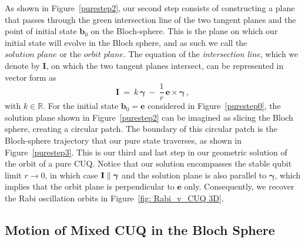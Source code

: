 \documentclass[12pt,a4paper]{article}
\begin{document}
As shown in Figure~\ref{purestep2}, our second step consists of constructing a plane that passes through the green intersection line of the two tangent planes and the point of initial state $\mathbf{b}_0$ on the Bloch-sphere. This is the plane on which our initial state will evolve in the Bloch sphere, and as such we call the $\textit{solution plane}$ or the $\textit{orbit plane}$. The equation of the {\em intersection line}, which we denote by $\mathbf{I}$, on which the two tangent planes intersect, can be represented in vector form as
\begin{equation}
   \mathbf{I}\ =\  k\,\boldsymbol{\gamma}\: -\: \dfrac{1}{r}\,\mathbf{e}\times \boldsymbol{\gamma}\,, 
\end{equation}
with $k \in \mathbb{R}$.
For the initial state $\mathbf{b}_0 = \mathbf{e}$ considered in Figure~\ref{purestep0}, the solution plane shown in Figure~\ref{purestep2} can be imagined as slicing the Bloch sphere, creating a circular patch. The boundary of this circular patch is the Bloch-sphere trajectory that our pure state traverses, as shown in Figure~\ref{purestep3}. This is our third and last step in our geometric solution of the orbit of a pure CUQ. Notice that our solution encompasses the stable qubit limit $r\to 0$, in which case ${\bf I} \parallel \boldsymbol{\gamma}$ and the solution plane is also parallel to $\boldsymbol{\gamma}$, which implies that the orbit plane is perpendicular to $\mathbf{e}$ only. Consequently, we recover the Rabi oscillation orbits in Figure~\ref{fig: Rabi_v_CUQ 3D}.


\subsection{Motion of Mixed CUQ in the Bloch Sphere\label{MixGeometrysol}}
\end{document}

